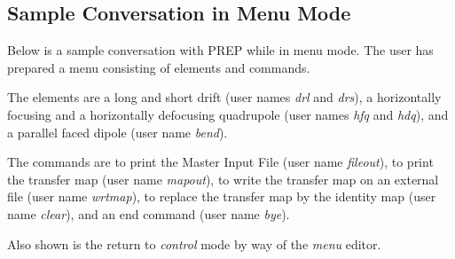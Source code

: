 \subsection{Sample Conversation in Menu Mode} Below is a sample
conversation with PREP while in menu mode. The user has prepared a menu
consisting of elements and commands.

The elements are a long and short drift (user names {\em drl\/} and {\em
drs}\/), a horizontally focusing and a horizontally defocusing quadrupole
(user names {\em hfq} and {\em hdq}\/), and a parallel faced dipole (user
name {\em bend}\/).

The commands are to print the Master Input File (user name {\em
fileout}\/), to print the transfer map (user name {\em mapout}\/), to write
the transfer map on an external file (user name {\em wrtmap}\/), to replace
the transfer map by the identity map (user name {\em clear}\/), and an end
command (user name {\em bye}\/).

Also shown is the return to {\em control} mode by way of the {\em menu}
editor.

